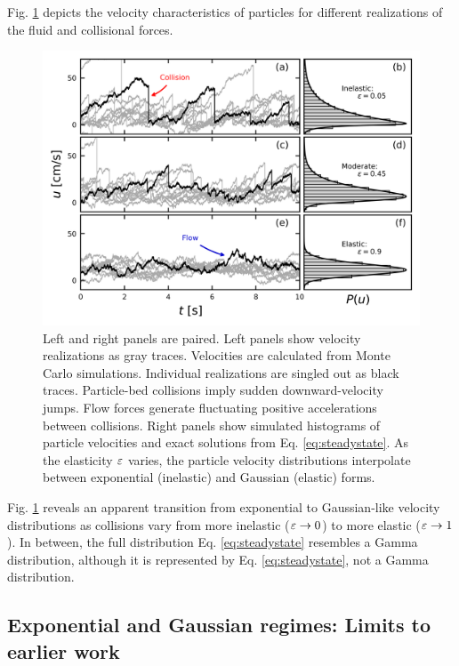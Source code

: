 Fig. \ref{fig:fig2} depicts the velocity characteristics of particles for different realizations of the fluid and collisional forces.
\begin{figure}
	\centerline{\includegraphics{./figures/ch5/Fig2pdfs.png}}
	\caption{Left and right panels are paired. Left panels show velocity realizations as gray traces. Velocities are calculated from Monte Carlo simulations. Individual realizations are singled out as black traces. Particle-bed collisions imply sudden downward-velocity jumps. Flow forces generate fluctuating positive accelerations between collisions. Right panels show simulated histograms of particle velocities and exact solutions from Eq. \ref{eq:steadystate}. As the elasticity $\varepsilon$ varies, the particle velocity distributions interpolate between exponential (inelastic) and Gaussian (elastic) forms.}
	\label{fig:fig2}
\end{figure}
Fig. \ref{fig:fig2} reveals an apparent transition from exponential to Gaussian-like velocity distributions as collisions vary from more inelastic ($\varepsilon \rightarrow 0$) to more elastic ($\varepsilon \rightarrow 1$). In between, the full distribution Eq. \ref{eq:steadystate} resembles a Gamma distribution, although it is represented by Eq. \ref{eq:steadystate}, not a Gamma distribution.


\subsection{Exponential and Gaussian regimes: Limits to earlier work}
\label{sec:langmodelcomparison}

